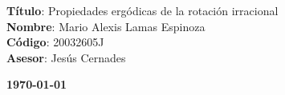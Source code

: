 \documentclass[a4paper,12pt]{report}
\theoremstyle{definition}
\begin{document}
	\begin{center}
		{\Large \textbf{Título}: Propiedades ergódicas de la rotación irracional\\		
		\textbf{Nombre}: Mario Alexis Lamas Espinoza\\		
		\textbf{Código}: 20032605J\\			
		\textbf{Asesor}: Jesús Cernades\\}
	\end{center}

	\begin{center}
		{\Large \textbf{\today}}
	\end{center}
	
	\onehalfspacing
	
	\tableofcontents
	
	
	
	 
	
	
	

\printbibliography[heading=bibintoc]
\end{document}
